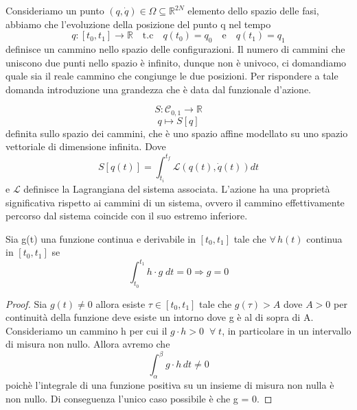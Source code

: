 Consideriamo un punto $(q,\dot q) \in \Omega \subseteq \mathbb{R}^{2N}$ elemento dello spazio delle fasi, abbiamo che l'evoluzione della posizione del punto q nel tempo
\begin{equation}
	q : [t_0,t_1] \rightarrow \mathbb{R} \quad \text{t.c} \quad  q(t_0) = q_0 \quad \text{e} \quad q(t_1) = q_1
\end{equation}
definisce un cammino nello spazio delle configurazioni. Il numero di cammini che uniscono due punti nello spazio \`{e} infinito, dunque non \`{e} univoco, ci domandiamo quale sia il reale cammino che congiunge le due posizioni. Per rispondere a tale domanda introduzione una grandezza che \`{e} data dal funzionale d'azione.

\begin{equation}
	S: \mathcal{C}_{0,1} \rightarrow \mathbb{R} 	
\end{equation}
\begin{equation*}
	q \mapsto S[q] 
\end{equation*}
definita sullo spazio dei cammini, che \`{e} uno spazio affine modellato su uno spazio vettoriale di dimensione infinita. Dove 
\begin{equation}
	S\left[q(t)\right]=\int_{t_i}^{t_f} \mathcal{L}\left(q(t), \dot{q}(t)\right) d t
\end{equation}
e $\mathcal{L}$ definisce la Lagrangiana del sistema associata. L'azione  ha una propriet\`{a} significativa rispetto ai cammini di un sistema, ovvero il cammino effettivamente percorso dal sistema coincide con il suo estremo inferiore. 
\begin{lemma}
	Sia g(t) una funzione continua e derivabile in $[t_0,t_1]$ tale che $\forall \,h(t)$ continua in $[t_0,t_1]$ se 
	\begin{equation*}
		\int_{t_0}^{t_1}h \cdot g \;dt = 0 \Rightarrow g = 0
	\end{equation*}
	\end{lemma}
	\begin{proof}
	Sia $g(t) \neq 0$ allora esiste $\tau \in [t_0,t_1]$ tale che $g(\tau) > A $ dove $A>0$ per continuit\`{a} della funzione deve esiste un intorno dove g \`{e} al di sopra di A. Consideriamo un cammino h per cui il $g\cdot h > 0 \;\; \forall \;t$, in particolare in un intervallo di misura non nullo. Allora avremo che 
	\begin{equation*}
		\int_{\alpha}^{\beta}g \cdot h \,dt \neq 0
	\end{equation*}
	poich\`{e} l'integrale di una funzione positiva su un insieme di misura non nulla \`{e} non nullo. Di conseguenza l'unico caso possibile \`{e} che g = 0.
	
	\end{proof}

